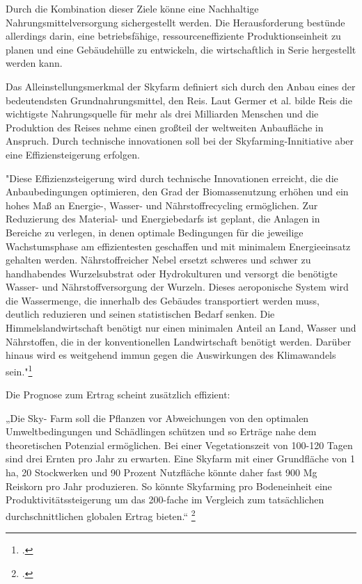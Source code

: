 \documentclass{scrartcl}
\begin{document}
Durch die Kombination dieser Ziele könne eine Nachhaltige Nahrungsmittelversorgung sichergestellt werden. Die Herausforderung bestünde allerdings darin, eine betriebsfähige, ressourceneffiziente Produktionseinheit zu planen und eine Gebäudehülle zu entwickeln, die wirtschaftlich in Serie hergestellt werden kann.

Das Alleinstellungsmerkmal der Skyfarm definiert sich durch den Anbau eines der bedeutendsten Grundnahrungsmittel, den Reis. Laut Germer et al. bilde Reis die wichtigste Nahrungsquelle für mehr als drei Milliarden Menschen und die Produktion des Reises nehme einen großteil der weltweiten Anbaufläche in Anspruch. Durch technische innovationen soll bei der Skyfarming-Innitiative aber eine Effiziensteigerung erfolgen.

"Diese Effizienzsteigerung wird durch technische Innovationen erreicht, die die Anbaubedingungen optimieren, den Grad der Biomassenutzung erhöhen und ein hohes Maß an Energie-, Wasser- und Nährstoffrecycling ermöglichen. Zur Reduzierung des Material- und Energiebedarfs ist geplant, die Anlagen in Bereiche zu verlegen, in denen optimale Bedingungen für die jeweilige Wachstumsphase am effizientesten geschaffen und mit minimalem Energieeinsatz gehalten werden. Nährstoffreicher Nebel ersetzt schweres und schwer zu handhabendes Wurzelsubstrat oder Hydrokulturen und versorgt die
benötigte Wasser- und Nährstoffversorgung der Wurzeln. Dieses aeroponische System wird die Wassermenge, die innerhalb des Gebäudes transportiert werden muss, deutlich reduzieren und seinen statistischen Bedarf senken. Die Himmelslandwirtschaft benötigt nur einen minimalen Anteil an Land, Wasser und Nährstoffen, die in der konventionellen Landwirtschaft benötigt werden. Darüber hinaus wird es weitgehend immun gegen die Auswirkungen des Klimawandels sein."\footcite[Vgl.][S. 237 f.]{Skyfarming an ecological innovation to enhance global food security}

Die Prognose zum Ertrag scheint zusätzlich effizient:

„Die Sky- Farm soll die Pflanzen vor Abweichungen von den optimalen Umweltbedingungen und Schädlingen schützen und so Erträge nahe dem theoretischen Potenzial ermöglichen. Bei einer Vegetationszeit von 100-120 Tagen sind drei Ernten pro Jahr zu erwarten. Eine Skyfarm mit einer Grundfläche von 1 ha, 20 Stockwerken und 90 Prozent Nutzfläche könnte daher fast 900 Mg Reiskorn pro Jahr produzieren. So könnte Skyfarming pro Bodeneinheit eine Produktivitätssteigerung um das 200-fache im Vergleich zum tatsächlichen durchschnittlichen globalen Ertrag bieten.“ \footcite[Vgl.][S. 237 f.]{Skyfarming an ecological innovation to enhance global food security}
\end{document}
